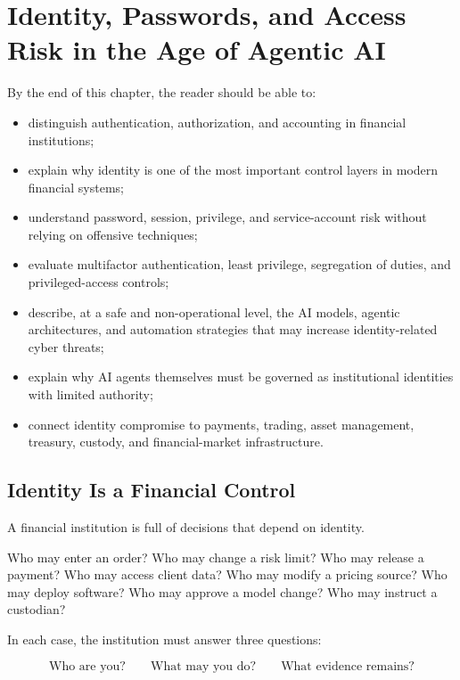 \chapter{Identity, Passwords, and Access Risk in the Age of Agentic AI}

\begin{learningobjectives}
By the end of this chapter, the reader should be able to:
\begin{itemize}
    \item distinguish authentication, authorization, and accounting in financial institutions;
    \item explain why identity is one of the most important control layers in modern financial systems;
    \item understand password, session, privilege, and service-account risk without relying on offensive techniques;
    \item evaluate multifactor authentication, least privilege, segregation of duties, and privileged-access controls;
    \item describe, at a safe and non-operational level, the AI models, agentic architectures, and automation strategies that may increase identity-related cyber threats;
    \item explain why AI agents themselves must be governed as institutional identities with limited authority;
    \item connect identity compromise to payments, trading, asset management, treasury, custody, and financial-market infrastructure.
\end{itemize}
\end{learningobjectives}

\section{Identity Is a Financial Control}

A financial institution is full of decisions that depend on identity.

Who may enter an order? Who may change a risk limit? Who may release a payment? Who may access client data? Who may modify a pricing source? Who may deploy software? Who may approve a model change? Who may instruct a custodian?

In each case, the institution must answer three questions:

\begin{equation}
\text{Who are you?}
\qquad
\text{What may you do?}
\qquad
\text{What evidence remains?}
\end{equation}


